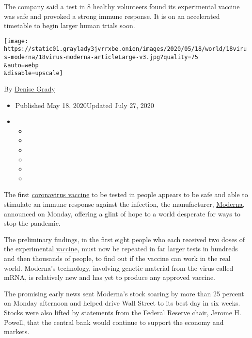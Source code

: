The company said a test in 8 healthy volunteers found its experimental
vaccine was safe and provoked a strong immune response. It is on an
accelerated timetable to begin larger human trials soon.

\texttt{[image: https://static01.graylady3jvrrxbe.onion/images/2020/05/18/world/18virus-moderna/18virus-moderna-articleLarge-v3.jpg?quality=75\\\&auto=webp\\\&disable=upscale]}

By \href{https://www.nytimes3xbfgragh.onion/by/denise-grady}{Denise
Grady}

\begin{itemize}
\item
  Published May 18, 2020Updated July 27, 2020
\item
  \begin{itemize}
  \item
  \item
  \item
  \item
  \item
  \item
  \end{itemize}
\end{itemize}

The first
\href{https://www.nytimes3xbfgragh.onion/2020/07/27/health/moderna-vaccine-covid.html}{coronavirus
vaccine} to be tested in people appears to be safe and able to stimulate
an immune response against the infection, the manufacturer,
\href{https://www.nytimes3xbfgragh.onion/2020/07/27/health/moderna-vaccine-covid.html}{Moderna},
announced on Monday, offering a glint of hope to a world desperate for
ways to stop the pandemic.

The preliminary findings, in the first eight people who each received
two doses of the experimental
\href{https://www.nytimes3xbfgragh.onion/2020/06/03/science/coronavirus-vaccine-horseshoe-crabs.html}{vaccine},
must now be repeated in far larger tests in hundreds and then thousands
of people, to find out if the vaccine can work in the real world.
Moderna's technology, involving genetic material from the virus called
mRNA, is relatively new and has yet to produce any approved vaccine.

The promising early news sent Moderna's stock soaring by more than 25
percent on Monday afternoon and helped drive Wall Street to its best day
in six weeks. Stocks were also lifted by statements from the Federal
Reserve chair, Jerome H. Powell, that the central bank would continue to
support the economy and markets.

